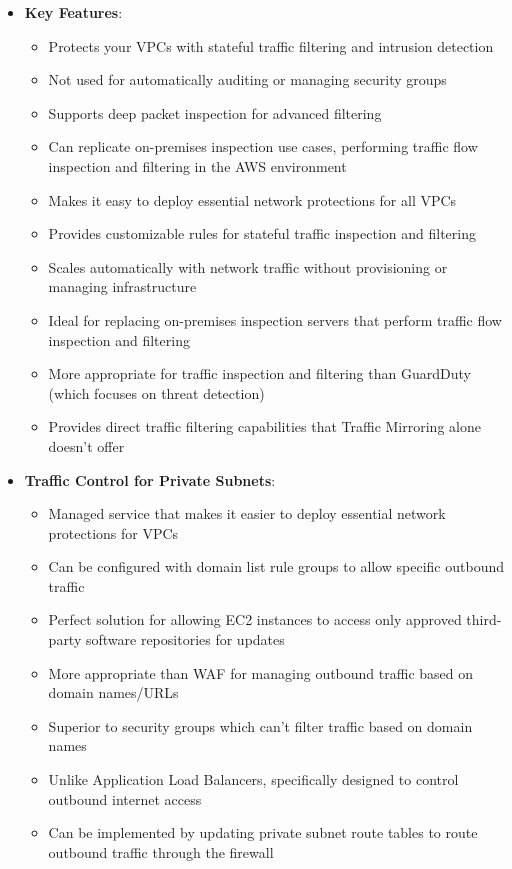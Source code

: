 \documentclass[11pt,a4paper]{report}
\begin{document}
\begin{itemize}
  \item \textbf{Key Features}:
\begin{itemize}
  \item Protects your VPCs with stateful traffic filtering and intrusion detection
  \item Not used for automatically auditing or managing security groups
  \item Supports deep packet inspection for advanced filtering
  \item Can replicate on-premises inspection use cases, performing traffic flow inspection and filtering in the AWS environment
  \item Makes it easy to deploy essential network protections for all VPCs
  \item Provides customizable rules for stateful traffic inspection and filtering
  \item Scales automatically with network traffic without provisioning or managing infrastructure
  \item Ideal for replacing on-premises inspection servers that perform traffic flow inspection and filtering
  \item More appropriate for traffic inspection and filtering than GuardDuty (which focuses on threat detection)
  \item Provides direct traffic filtering capabilities that Traffic Mirroring alone doesn't offer
\end{itemize}
  \item \textbf{Traffic Control for Private Subnets}:
\begin{itemize}
  \item Managed service that makes it easier to deploy essential network protections for VPCs
  \item Can be configured with domain list rule groups to allow specific outbound traffic
  \item Perfect solution for allowing EC2 instances to access only approved third-party software repositories for updates
  \item More appropriate than WAF for managing outbound traffic based on domain names/URLs
  \item Superior to security groups which can't filter traffic based on domain names
  \item Unlike Application Load Balancers, specifically designed to control outbound internet access
  \item Can be implemented by updating private subnet route tables to route outbound traffic through the firewall

\end{itemize}
\end{itemize}
\end{document}

